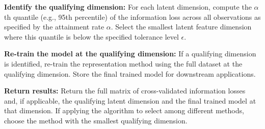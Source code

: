 \begin{algorithm}
\begin{algorithmic}[1]
\State \textbf{Identify the qualifying dimension:} For each latent dimension, compute the $\alpha$th quantile (e.g., 95th percentile) of the information loss across all observations as specified by the attainment rate $\alpha$. Select the smallest latent feature dimension where this quantile is below the specified tolerance level $\epsilon$.

\State \textbf{Re-train the model at the qualifying dimension:} If a qualifying dimension is identified, re-train the representation method using the full dataset at the qualifying dimension. Store the final trained model for downstream applications.

\State \textbf{Return results:} Return the full matrix of cross-validated information losses and, if applicable, the qualifying latent dimension and the final trained model at that dimension. If applying the algorithm to select among different methods, choose the method with the smallest qualifying dimension.

\end{algorithmic}
\end{algorithm}


